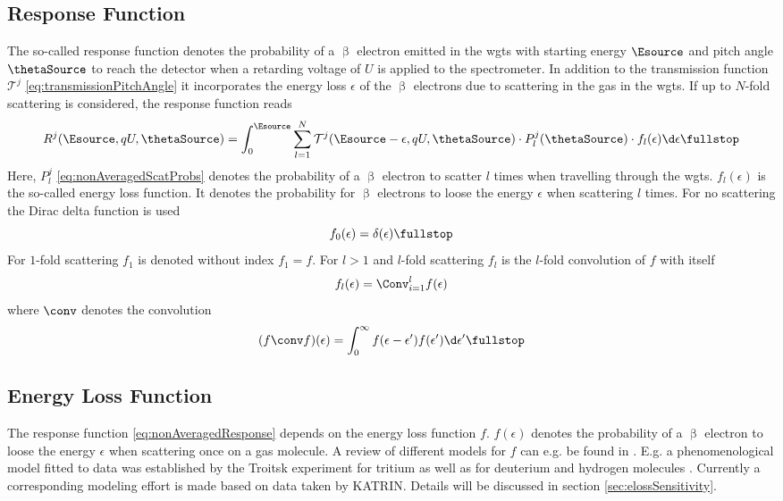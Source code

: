 \subsection{Response Function}
\label{sec:response}
The so-called response function denotes the probability of a $\upbeta$ electron emitted in the \gls{wgts} with starting energy $\Esource$ and pitch angle $\thetaSource$ to reach the detector when a retarding voltage of $U$ is applied to the spectrometer. In addition to the transmission function $\mathcal{T}^j$ \eqref{eq:transmissionPitchAngle} it incorporates the energy loss $\epsilon$ of the $\upbeta$ electrons due to scattering in the gas in the \gls{wgts}. If up to $N$-fold scattering is considered, the response function reads
\begin{equation}
    \label{eq:nonAveragedResponse}
    R^j(\Esource, qU, \thetaSource) = 
    \int_0^{\Esource}
        \sum_{l=1}^{N}
            \mathcal{T}^j(\Esource-\epsilon, qU, \thetaSource) \cdot
            P^j_l(\thetaSource) \cdot f_l(\epsilon)
    \d \epsilon
    \fullstop
\end{equation}
Here, $P^j_l$ \eqref{eq:nonAveragedScatProbs} denotes the probability of a $\upbeta$ electron to scatter $l$ times when travelling through the \gls{wgts}. $f_l(\epsilon)$ is the so-called energy loss function. It denotes the probability for $\upbeta$ electrons to loose the energy $\epsilon$ when scattering $l$ times. For no scattering the Dirac delta function is used
\begin{equation}
    f_0(\epsilon) = \delta(\epsilon) \fullstop
\end{equation}
For $1$-fold scattering $f_1$ is denoted without index $f_1 = f$. For $l>1$ and $l$-fold scattering $f_l$ is the $l$-fold convolution of $f$ with itself
\begin{equation}
    f_l(\epsilon) = \Conv_{i=1}^{l} f(\epsilon)
\end{equation}
where $\conv$ denotes the convolution
\begin{equation}
    (f \conv f)(\epsilon) = \int_{0}^{\infty}  f(\epsilon-\epsilon^\prime)f(\epsilon^\prime) \d \epsilon^\prime \fullstop 
\end{equation}

\subsection{Energy Loss Function}
\label{sec:eloss}
The response function \eqref{eq:nonAveragedResponse} depends on the energy loss function $f$. $f(\epsilon)$ denotes the probability of a $\upbeta$ electron to loose the energy $\epsilon$ when scattering once on a gas molecule. A review of different models for $f$ can e.g. be found in \cite{Trost2019}. E.g. a phenomenological model fitted to data was established by the Troitsk experiment for tritium \cite{Aseev2000} as well as for deuterium and hydrogen molecules \cite{Abdurashitov2017}. Currently a corresponding  modeling effort is made based on data taken by KATRIN. Details will be discussed in section \ref{sec:elossSensitivity}.

